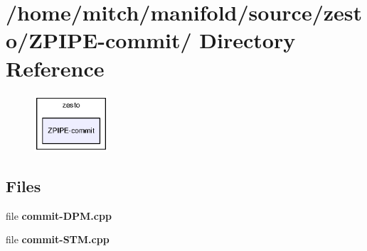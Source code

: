 \section{/home/mitch/manifold/source/zesto/ZPIPE-commit/ Directory Reference}
\label{dir_e9462c8a8fa0956c3f003f6393e2a80d}


\nopagebreak
\begin{figure}[H]
\begin{center}
\leavevmode
\includegraphics[width=78pt]{dir_e9462c8a8fa0956c3f003f6393e2a80d_dep}
\end{center}
\end{figure}
\subsection*{Files}
\begin{CompactItemize}
\item 
file {\bf commit-DPM.cpp}
\item 
file {\bf commit-STM.cpp}
\end{CompactItemize}
